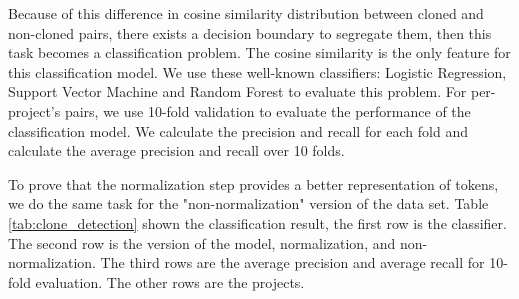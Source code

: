 Because of this difference in cosine similarity distribution between cloned and non-cloned pairs, there exists a decision boundary to segregate them, then this task becomes a classification problem. The cosine similarity is the only feature for this classification model. We use these well-known classifiers: Logistic Regression, Support Vector Machine and Random Forest to evaluate this problem. For per-project's pairs, we use 10-fold validation to evaluate the performance of the classification model. We calculate the precision and recall for each fold and calculate the average precision and recall over 10 folds.

To prove that the normalization step provides a better representation of tokens, we do the same task for the "non-normalization" version of the data set. Table \ref{tab:clone_detection} shown the classification result, the first row is the classifier. The second row is the version of the model, normalization, and non-normalization. The third rows are the average precision and average recall for 10-fold evaluation. The other rows are the projects.



